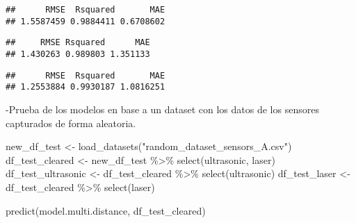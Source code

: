 \documentclass[
]{article}
\newenvironment{Shaded}{\begin{snugshade}}{\end{snugshade}}
\newcommand{\FunctionTok}[1]{\textcolor[rgb]{0.00,0.00,0.00}{#1}}
\newcommand{\NormalTok}[1]{#1}
\newcommand{\OtherTok}[1]{\textcolor[rgb]{0.56,0.35,0.01}{#1}}
\newcommand{\SpecialCharTok}[1]{\textcolor[rgb]{0.00,0.00,0.00}{#1}}
\newcommand{\StringTok}[1]{\textcolor[rgb]{0.31,0.60,0.02}{#1}}
\begin{document}
\begin{Shaded}
\end{Shaded}

\begin{verbatim}
##      RMSE  Rsquared       MAE 
## 1.5587459 0.9884411 0.6708602
\end{verbatim}

\begin{Shaded}
\end{Shaded}

\begin{verbatim}
##     RMSE Rsquared      MAE 
## 1.430263 0.989803 1.351133
\end{verbatim}

\begin{Shaded}
\end{Shaded}

\begin{verbatim}
##      RMSE  Rsquared       MAE 
## 1.2553884 0.9930187 1.0816251
\end{verbatim}

-Prueba de los modelos en base a un dataset con los datos de los
sensores capturados de forma aleatoria.

\begin{Shaded}
\begin{Highlighting}[]
\NormalTok{new\_df\_test }\OtherTok{\textless{}{-}} \FunctionTok{load\_datasets}\NormalTok{(}\StringTok{"random\_dataset\_sensors\_A.csv"}\NormalTok{)}
\NormalTok{df\_test\_cleared }\OtherTok{\textless{}{-}}\NormalTok{ new\_df\_test }\SpecialCharTok{\%\textgreater{}\%} \FunctionTok{select}\NormalTok{(ultrasonic, laser)}
\NormalTok{df\_test\_ultrasonic }\OtherTok{\textless{}{-}}\NormalTok{ df\_test\_cleared }\SpecialCharTok{\%\textgreater{}\%} \FunctionTok{select}\NormalTok{(ultrasonic)}
\NormalTok{df\_test\_laser }\OtherTok{\textless{}{-}}\NormalTok{ df\_test\_cleared }\SpecialCharTok{\%\textgreater{}\%} \FunctionTok{select}\NormalTok{(laser)}

\FunctionTok{predict}\NormalTok{(model.multi.distance, df\_test\_cleared)}
\end{Highlighting}
\end{Shaded}
\end{document}
